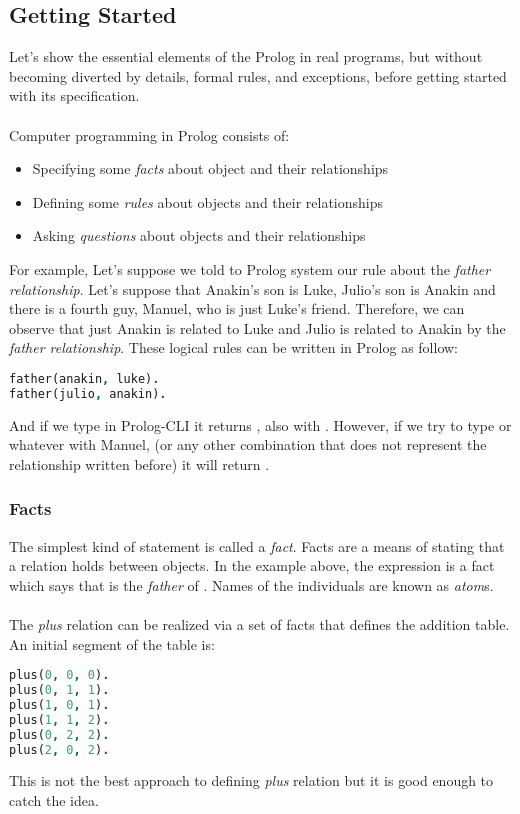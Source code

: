 \subsection{Getting Started}
Let's show the essential elements of the Prolog in real programs, but without becoming diverted by details, formal rules, and exceptions, before getting started with its specification.\\\\
Computer programming in Prolog consists of:
\begin{itemize}
	\item Specifying some \textit{facts} about object and their relationships
	\item Defining some \textit{rules} about objects and their relationships
	\item Asking \textit{questions} about objects and their relationships
\end{itemize}

For example, Let's suppose we told to Prolog system our rule about the \textit{father relationship}. Let's suppose that Anakin's son is Luke, Julio's son is Anakin and there is a fourth guy, Manuel, who is just Luke's friend. Therefore, we can observe that just Anakin is related to Luke and Julio is related to Anakin by the \textit{father relationship}. These logical rules can be written in Prolog as follow:
\begin{lstlisting}[language=Prolog, caption=Father Relationship]
father(anakin, luke).
father(julio, anakin).
\end{lstlisting}
And if we type in Prolog-CLI  it returns , also with . However, if we try to type  or whatever with Manuel, (or any other combination that does not represent the relationship written before) it will return .
\subsubsection{Facts}
The simplest kind of statement is called a \textit{fact}. Facts are a means of stating that a relation holds between objects. In the example above, the expression  is a fact which says that  is the \textit{father} of . Names of the individuals are known as \textit{atom}s.\\\\
The \textit{plus} relation can be realized via a set of facts that defines the addition table. An initial segment of the table is:
\begin{lstlisting}[language=Prolog, caption=Plus Relationship]
plus(0, 0, 0).
plus(0, 1, 1).
plus(1, 0, 1).
plus(1, 1, 2).
plus(0, 2, 2).
plus(2, 0, 2).
\end{lstlisting}
This is not the best approach to defining \textit{plus} relation but it is good enough to catch the idea.
